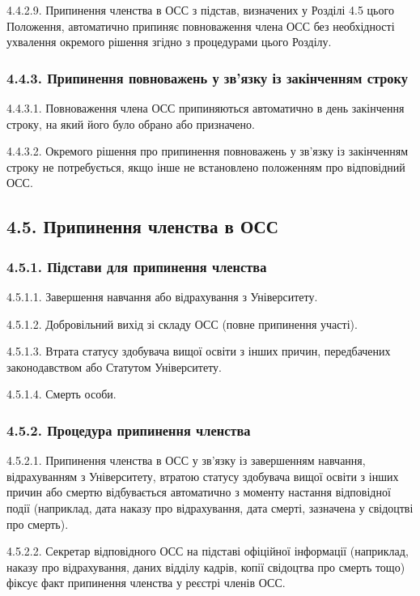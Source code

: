         4.4.2.9. Припинення членства в ОСС з підстав, визначених у Розділі 4.5 цього Положення, автоматично припиняє повноваження члена ОСС без необхідності ухвалення окремого рішення згідно з процедурами цього Розділу.

    \subsubsection*{4.4.3. Припинення повноважень у зв'язку із закінченням строку}
        4.4.3.1. Повноваження члена ОСС припиняються автоматично в день закінчення строку, на який його було обрано або призначено.

        4.4.3.2. Окремого рішення про припинення повноважень у зв'язку із закінченням строку не потребується, якщо інше не встановлено положенням про відповідний ОСС.

\subsection*{4.5. Припинення членства в ОСС}
    \subsubsection*{4.5.1. Підстави для припинення членства}
        4.5.1.1. Завершення навчання або відрахування з Університету.

        4.5.1.2. Добровільний вихід зі складу ОСС (повне припинення участі).

        4.5.1.3. Втрата статусу здобувача вищої освіти з інших причин, передбачених законодавством або Статутом Університету.

        4.5.1.4. Смерть особи.

    \subsubsection*{4.5.2. Процедура припинення членства}
        4.5.2.1. Припинення членства в ОСС у зв'язку із завершенням навчання, відрахуванням з Університету, втратою статусу здобувача вищої освіти з інших причин або смертю відбувається автоматично з моменту настання відповідної події (наприклад, дата наказу про відрахування, дата смерті, зазначена у свідоцтві про смерть).

        4.5.2.2. Секретар відповідного ОСС на підставі офіційної інформації (наприклад, наказу про відрахування, даних відділу кадрів, копії свідоцтва про смерть тощо) фіксує факт припинення членства у реєстрі членів ОСС.


